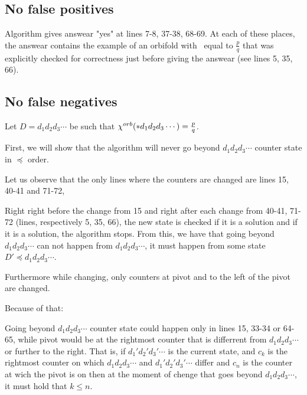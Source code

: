 \subsection{No false positives}
Algorithm gives answear "yes" at lines 7-8, 37-38, 68-69. At each of these places, 
the answear contains the example of an orbifold with \Eoc\ equal to $\frac{p}{q}$ that was 
explicitly checked for correctness just before giving the answear (see lines 5, 35, 66). 
\subsection{No false negatives}
Let $D = d_1d_2d_3\cdots$ be such that ${\chi^{orb}(*d_1d_2d_3\cdots)} = \frac{p}{q}$. 

%

First, we will show that the algorithm will never 
go beyond $d_1d_2d_3\cdots$ counter state in $\preceq$ order. 

Let us observe that the only lines where 
the counters are changed are lines 15, 40-41 and 71-72, 

Right right before 
the change from 15 and right after each change from 40-41, 71-72 
(lines, respectively 5, 35, 66), 
the new state is checked if it is a solution and 
if it is a solution, the algorithm stops. From this, we 
have that going beyond $d_1d_2d_3\cdots$ can not happen from $d_1d_2d_3\cdots$, 
it must happen from some state $D' \preceq d_1d_2d_3\cdots$.

Furthermore while changing, 
only counters 
at pivot and to the left of the pivot are changed. 

Because of that:
\begin{observation}\label{position of pointer observation}
Going beyond $d_1d_2d_3\cdots$ counter state 
could happen only in lines 15, 33-34 or 64-65, while pivot would be 
at the rightmost counter that is differrent from $d_1d_2d_3\cdots$ or further to the right. 
That is, if $d_1'd_2'd_3'\cdots$ is the current state, and 
$c_k$ is the rightmost counter on which $d_1d_2d_3\cdots$ 
and $d_1'd_2'd_3'\cdots$ differ and $c_n$ is the counter at wich the pivot is on then 
at the moment of chenge that goes beyond $d_1d_2d_3\cdots$, it must hold that $k \leq n$.
\end{observation}

